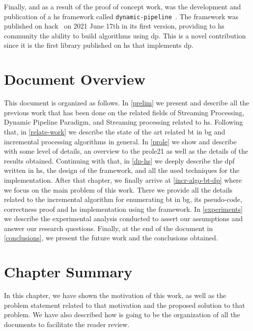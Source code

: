 Finally, and as a result of the proof of concept work, was the development and publication of a \acrshort{hs} framework called \texttt{dynamic-pipeline}~\cite{dynamic-pipeline}. 
The framework was published on \acrfull{hack}~\cite{hackage} on 2021 June 17th in its first version,
providing to \acrshort{hs} community the ability to build algorithms using \acrshort{dp}. This is a novel contribution since it is the first library published on \acrshort{hs}
that implements \acrshort{dp}.

\section{Document Overview}
This document is organized as follows. In \autoref{prelim} we present and describe all the previous work that has been done on the related fields of Streaming Processing, Dynamic Pipeline Paradigm, and Streaming processing related to \acrshort{hs}. 
Following that, in \autoref{relate-work} we describe the state of the art related \acrshort{bt} in \acrshort{bg} and incremental processing algorithms in general.
In \autoref{prole} we show and describe with some level of details, an overview to the \acrshort{prole21} as well as the details of the results obtained. 
Continuing with that, in \autoref{dp-hs} we deeply describe the \acrshort{dpf} written in \acrshort{hs}, the design of the framework, and all the used techniques for the implementation.
After that chapter, we finally arrive at \autoref{incr-algo-bt-dp} where we focus on the main problem of this work. There we provide all the details related to the incremental algorithm for enumerating \acrshort{bt} in \acrshort{bg}, its pseudo-code,
correctness proof and \acrshort{hs} implementation using the framework.
In \autoref{experiments} we describe the experimental analysis conducted to assert our assumptions and answer our research questions.
Finally, at the end of the document in \autoref{conclusions}, we present the future work and the conclusions obtained.

\section{Chapter Summary}
In this chapter, we have shown the motivation of this work, as well as the problem statement related to that motivation and the proposed solution to that problem.
We have also described how is going to be the organization of all the documents to facilitate the reader review.

